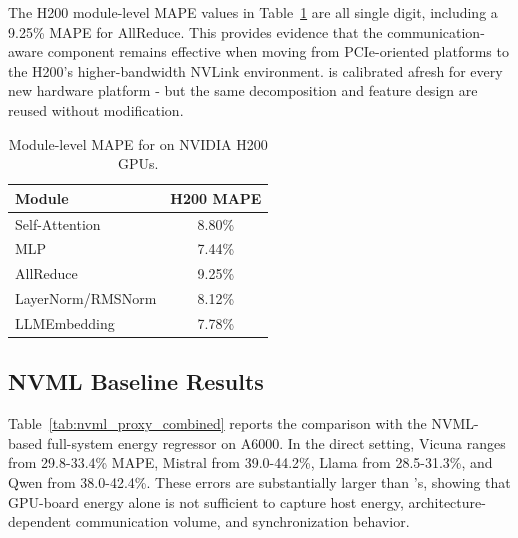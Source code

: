 The H200 module-level MAPE values in Table~\ref{tab:h200_module_results} are all single digit, including a 9.25\% MAPE for AllReduce. This provides evidence that the communication-aware component remains effective when moving from PCIe-oriented platforms to the H200's higher-bandwidth NVLink environment. \sys{} is calibrated afresh for every new hardware platform - but the same decomposition and feature design are reused without modification.

\begin{table}[t]
\centering
\small
\setlength{\tabcolsep}{6pt}
\renewcommand{\arraystretch}{1.05}
\begin{tabular}{lc}
\toprule
\textbf{Module} & \textbf{H200 MAPE} \\
\midrule
\rowcolor{rowblue} Self-Attention      & 8.80\% \\
MLP                                    & 7.44\% \\
\rowcolor{rowblue} AllReduce           & 9.25\% \\
LayerNorm/RMSNorm                      & 8.12\% \\
\rowcolor{rowblue} LLMEmbedding        & 7.78\% \\
\bottomrule
\end{tabular}
\vspace{5pt}
\caption{Module-level MAPE for \sys{} on NVIDIA H200 GPUs.}
\vspace{-5pt}
\label{tab:h200_module_results}
\end{table}

\subsection{NVML Baseline Results}
Table~\ref{tab:nvml_proxy_combined} reports the comparison with the NVML-based full-system energy regressor on A6000. In the direct setting, Vicuna ranges from 29.8-33.4\% MAPE, Mistral from 39.0-44.2\%, Llama from 28.5-31.3\%, and Qwen from 38.0-42.4\%. These errors are substantially larger than \sys{}'s, showing that GPU-board energy alone is not sufficient to capture host energy, architecture-dependent communication volume, and synchronization behavior.

